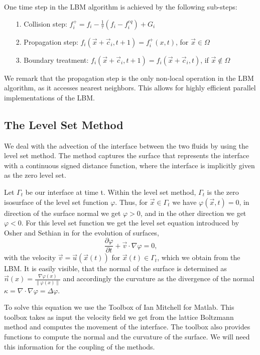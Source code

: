 \documentclass[final,leqno,onefignum,onetabnum]{siamltexmm}
\begin{document}
One time step in the LBM algorithm is achieved by the following sub-steps:
\begin{itemize}
	\item[1. ] Collision step: $f_i^+ = f_i - \frac1\tau(f_i - f_i ^{eq}) + G_i$
	\item[2. ] Propagation step: $f_i(\vec{x}+\vec c_i ,t+1) = f_i^+(x,t)$, for $\vec{x} \in \Omega$
	\item[3. ] Boundary treatment: $f_i(\vec{x}+\vec c_i ,t+1) = f_i(\vec{x}+\vec c_i ,t)$, if $\vec{x} \notin \Omega$
\end{itemize}

We remark that the propagation step is the only non-local operation in the LBM algorithm, as it accesses nearest neighbors. This allows for highly efficient parallel implementations of the LBM.
\subsection{The Level Set Method}
We deal with the advection of the interface between the two fluids by using the level set method. The method captures the surface that represents the interface with a continuous signed distance function, where the interface is implicitly given as the zero level set.

Let $\Gamma_t$ be our interface at time t. Within the level set method, $\Gamma_t$ is the zero isosurface of the level set function $\varphi$. Thus, for $\vec x \in \Gamma_t$ we have $\varphi(\vec x,t) = 0$, in direction of the surface normal we get $\varphi > 0$, and in the other direction we get $\varphi < 0$. For this level set function we get the level set equation introduced by Osher and Sethian in \cite{OsherSethian} for the evolution of surfaces,
\begin{equation}
  \frac{\partial \varphi}{\partial t} + \vec v \cdot \nabla \varphi = 0 \text{,}
\end{equation}
with the velocity $\vec v = \vec u(\vec x(t))$ for $\vec x(t) \in \Gamma_t$, which we obtain from the LBM. It is easily visible, that the normal of the surface is determined as $\vec n(x) = \frac{\nabla \varphi(x)}{\|\varphi(x)\|}$ and accordingly the curvature as the divergence of the normal $\kappa = \nabla \cdot \nabla \varphi = \Delta \varphi$.

To solve this equation we use the Toolbox of Ian Mitchell \cite{mitchell} for Matlab. This toolbox takes as input the velocity field we get from the lattice Boltzmann method and computes the movement of the interface. The toolbox also provides functions to compute the normal and the curvature of the surface. We will need this information for the coupling of the methods.
\end{document}
